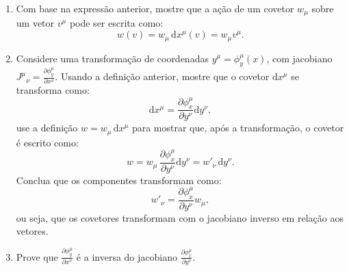 \begin{enumerate}
\begin{enumerate}
                  \item Com base na expressão anterior, mostre que a ação de um covetor
                        $w_\mu$ sobre um vetor $v^\mu$ pode ser escrita como:
                        $$
                              w(v) = w_\mu \,\mathrm{d}x^\mu(v) = w_\mu v^\mu.
                        $$

                  \item Considere uma transformação de coordenadas $y^\mu =
                              \phi_y^\mu(x)$, com jacobiano $J^\mu{}_\nu =
                              \frac{\partial \phi_y^\mu}{\partial x^\nu}$. Usando a definição
                        anterior, mostre que o covetor $\mathrm{d}x^\mu$ se transforma como:
                        $$
                              \mathrm{d}x^\mu = \frac{\partial \phi_x^\mu}{\partial y^\nu} \mathrm{d}y^\nu,
                        $$
                        use a definição $w = w_\mu \, \mathrm{d}x^\mu$ para mostrar que,
                        após a transformação, o covetor é escrito como:
                        $$
                              w = w_\mu \, \frac{\partial \phi_x^\mu}{\partial y^\nu} \mathrm{d}y^\nu = w'_\nu \, \mathrm{d}y^\nu.
                        $$
                        Conclua que os componentes transformam como:
                        $$
                              w'_\nu = \frac{\partial \phi_x^\mu}{\partial y^\nu} w_\mu,
                        $$
                        ou seja, que os covetores transformam com o jacobiano inverso em
                        relação aos vetores.
                  \item Prove que $\frac{\partial \phi_y^\mu}{\partial x^\nu}$ é a inversa
                        do jacobiano $\frac{\partial \phi_x^\mu}{\partial y^\nu}$.
            \end{enumerate}
\end{enumerate}


